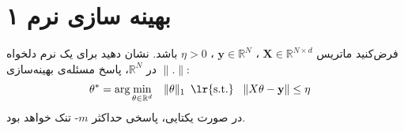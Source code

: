 \section{بهینه سازی نرم ۱}
فرض‌کنید ماتریس
$\mathbf{X}\in \mathbb{R}^{{N}\times{d}} $
،
$\mathbf{y} \in  \mathbb{R}^{N}$
،
$\eta > 0 $
باشد. نشان دهید برای یک نرم دلخواه
$\| . \|$
در
$\mathbb{R}^{N}$،
پاسخ مسئله‌ی بهینه‌سازی:
\begin{equation}
\nonumber
\begin{array}{rrclcl}
\displaystyle \mathbf{\theta}^* =  \arg \min_{\mathbf{\theta} \in \mathbb{R}^{d}} & \multicolumn{3}{l}{\lVert \mathbf{\theta} \rVert_{1}} 
\textrm{\lr{s.t.}} & \|X \mathbf{\theta} - \mathbf{y} \| \leq \eta &  \\
\end{array}
\end{equation}
در صورت یکتایی، پاسخی حداکثر
${m}$-
تنک خواهد بود.